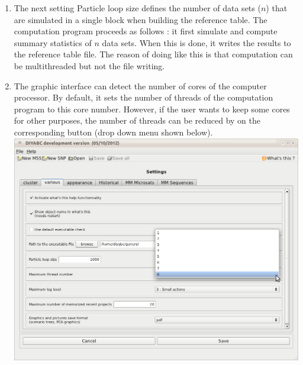\begin{enumerate}
\item The next setting \textsf{Particle loop size} defines the number of
data sets ($n$) that are simulated in a single block when building
the reference table. The computation program proceeds as follows :
it first simulate and compute summary statistics of $n$ data sets.
When this is done, it writes the results to the reference table file.
The reason of doing like this is that computation can be multithreaded
but not the file writing.
\item The graphic interface can detect the number of cores of the computer
processor. By default, it sets the number of threads of the computation
program to this core number. However, if the user wants to keep some
cores for other purposes, the number of threads can be reduced by
on the corresponding button (drop down menu shown below).\\
 \includegraphics[scale=0.33]{gui_pictures/Capture-DIYABC-95} \\


\end{enumerate}
